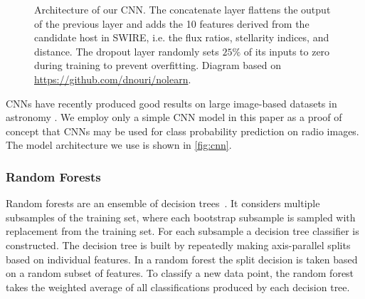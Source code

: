 \documentclass[fleqn,usenatbib,usedcolumn]{mnras}
\begin{document}
\begin{figure}
        \caption{Architecture of our CNN. The concatenate layer flattens the
          output of the previous layer and adds the 10 features derived from
          the candidate host in SWIRE, i.e. the flux ratios, stellarity
          indices, and distance. The dropout layer randomly sets $25\%$ of its
          inputs to zero during training to prevent overfitting. Diagram based
          on \url{ https://github.com/dnouri/nolearn}.}
        \label{fig:cnn}
      \end{figure}

      CNNs have recently produced good results on large image-based datasets in
      astronomy \citep[e.g.][]{dieleman15cnn, lukic17compact}. We employ only a
      simple CNN model in this paper as a proof of concept that CNNs may be used
      for class probability prediction on radio images. The model architecture
      we use is shown in \autoref{fig:cnn}.

    \subsubsection{Random Forests}
    \label{sec:random-forests}

      Random forests are an ensemble of decision
      trees~\citep{breiman01random-forest}. It considers multiple subsamples
      of the training set, where each bootstrap subsample is sampled with
      replacement from the training set. For each subsample a decision tree
      classifier is constructed. The decision tree is built by repeatedly
      making axis-parallel splits based on individual features. In a random
      forest the split decision is taken based on a random subset of features.
      To classify a new data point, the random forest takes the weighted
      average of all classifications produced by each decision tree.
\end{document}
